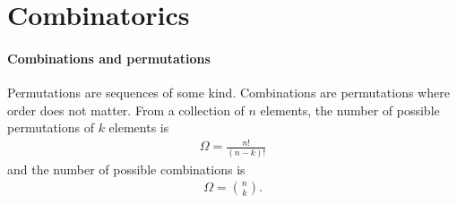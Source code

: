 \section{Combinatorics}

\paragraph{Combinations and permutations}
Permutations are sequences of some kind. Combinations are permutations where order does not matter. From a collection of $n$ elements, the number of possible permutations of $k$ elements is
\begin{align*}
	\Omega = \frac{n!}{(n - k)!}
\end{align*}
and the number of possible combinations is
\begin{align*}
	\Omega = \binom{n}{k}.
\end{align*}